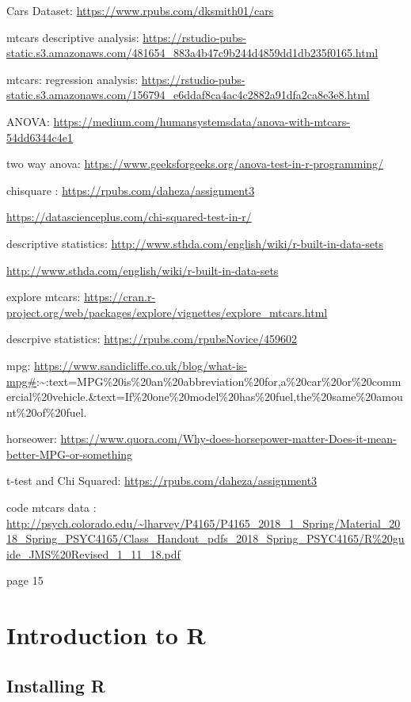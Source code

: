 \documentclass[
]{book}
\begin{document}
Cars Dataset: \url{https://www.rpubs.com/dksmith01/cars}

mtcars descriptive analysis: \url{https://rstudio-pubs-static.s3.amazonaws.com/481654_883a4b47c9b244d4859dd1db235f0165.html}

mtcars: regression analysis: \url{https://rstudio-pubs-static.s3.amazonaws.com/156794_e6ddaf8ca4ac4c2882a91dfa2ca8e3e8.html}

ANOVA: \url{https://medium.com/humansystemsdata/anova-with-mtcars-54dd6344c4e1}

two way anova: \url{https://www.geeksforgeeks.org/anova-test-in-r-programming/}

chisquare : \url{https://rpubs.com/daheza/assignment3}

\url{https://datascienceplus.com/chi-squared-test-in-r/}

descriptive statistics: \url{http://www.sthda.com/english/wiki/r-built-in-data-sets}

\url{http://www.sthda.com/english/wiki/r-built-in-data-sets}

explore mtcars: \url{https://cran.r-project.org/web/packages/explore/vignettes/explore_mtcars.html}

descrpive statistics: \url{https://rpubs.com/rpubsNovice/459602}

mpg: \url{https://www.sandicliffe.co.uk/blog/what-is-mpg\#}:\textasciitilde:text=MPG\%20is\%20an\%20abbreviation\%20for,a\%20car\%20or\%20commercial\%20vehicle.\&text=If\%20one\%20model\%20has\%20fuel,the\%20same\%20amount\%20of\%20fuel.

horseower: \url{https://www.quora.com/Why-does-horsepower-matter-Does-it-mean-better-MPG-or-something}

t-test and Chi Squared: \url{https://rpubs.com/daheza/assignment3}

code mtcars data : \url{http://psych.colorado.edu/~lharvey/P4165/P4165_2018_1_Spring/Material_2018_Spring_PSYC4165/Class_Handout_pdfs_2018_Spring_PSYC4165/R\%20guide_JMS\%20Revised_1_11_18.pdf}

page 15

\hypertarget{intro1}{%
\chapter{Introduction to R}\label{intro1}}


\hypertarget{installing-r}{%
\section{Installing R}\label{installing-r}}
\end{document}
